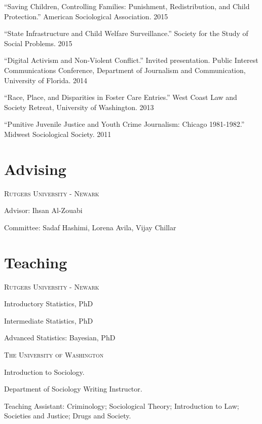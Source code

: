 \documentclass[margin,line]{res}
\newenvironment{list1}{
  \begin{list}{\ding{113}}{%
      \setlength{\itemsep}{0in}
      \setlength{\parsep}{0in} \setlength{\parskip}{0in}
      \setlength{\topsep}{0in} \setlength{\partopsep}{0in}
      \setlength{\leftmargin}{0.17in}}}{\end{list}}
\begin{document}
\begin{resume}
``Saving Children, Controlling Families: Punishment, Redistribution, and Child Protection.'' American Sociological Association. 2015

``State Infrastructure and Child Welfare Surveillance.'' Society for the Study of Social Problems. 2015

``Digital Activism and Non-Violent Conflict.'' Invited presentation. Public Interest Communications Conference, Department of Journalism and Communication, University of Florida. 2014

``Race, Place, and Disparities in Foster Care Entries.'' West Coast Law and Society Retreat, University of Washington. 2013

``Punitive Juvenile Justice and Youth Crime Journalism: Chicago 1981-1982.'' Midwest Sociological Society. 2011

\section{\sc Advising}

\textsc{Rutgers University - Newark}

\begin{list1}
  \item[]Advisor: Ihsan Al-Zouabi
  \item[]Committee: Sadaf Hashimi, Lorena Avila, Vijay Chillar
\end{list1}

\section{\sc Teaching}

\textsc{Rutgers University - Newark}

\begin{list1}
  \item[]Introductory Statistics, PhD 
  \item[]Intermediate Statistics, PhD 
  \item[]Advanced Statistics: Bayesian, PhD
\end{list1}

\textsc{The University of Washington}
\begin{list1}

  \item[]Introduction to Sociology. 
  \item[]Department of Sociology Writing Instructor. 
  \item[]Teaching Assistant: Criminology; Sociological Theory; Introduction to Law; Societies and Justice; Drugs and Society.


\end{list1}
\end{resume}
\end{document}
